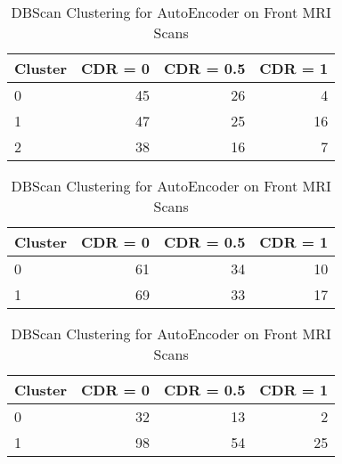\begin{table}[h] \centering
\begin{minipage}{0.3\textwidth}

\begin{tabular}{lrrr}
\toprule
Cluster & CDR = 0 & CDR = 0.5 & CDR = 1\\
\midrule
0 & 45 & 26 & 4\\
1 & 47 & 25 & 16\\
2 & 38 & 16 & 7\\
\bottomrule
\end{tabular}
\caption{Kmeans Clustering with 3 Clusters for AutoEncoder on Front MRI Scans}
\end{minipage}
\hspace{3cm}
\begin{minipage}{0.3\textwidth}

\begin{tabular}{lrrr}
\toprule
Cluster & CDR = 0 & CDR = 0.5 & CDR = 1\\
\midrule
0 & 61 & 34 & 10\\
1 & 69 & 33 & 17\\
\bottomrule
\end{tabular}
\caption{Kmeans Clustering with 2 Clusters for AutoEncoder on Front MRI Scans}
\end{minipage}
\hspace{3cm}
\begin{minipage}{0.3\textwidth}

\begin{tabular}{lrrr}
\toprule
Cluster & CDR = 0 & CDR = 0.5 & CDR = 1\\
\midrule
0 & 32 & 13 & 2\\
1 & 98 & 54 & 25\\
\bottomrule
\end{tabular}
\caption{DBScan Clustering for AutoEncoder on Front MRI Scans}
\end{minipage}
\end{table}
